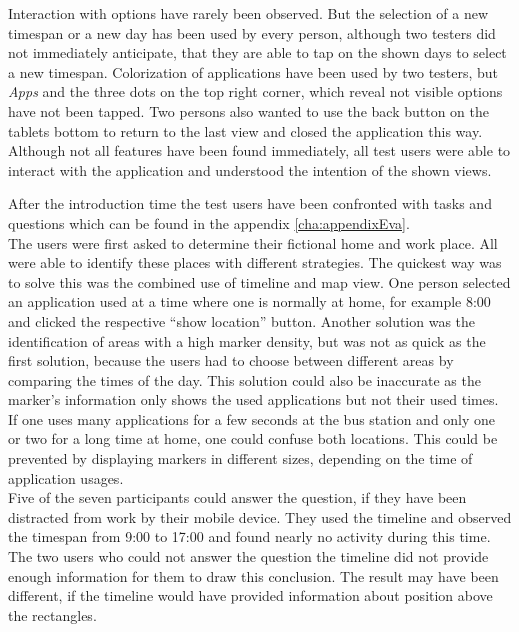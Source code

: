 Interaction  with options have rarely been observed. But the selection of a new timespan or a new day has been used by every person, although two testers did not immediately anticipate, that they are able to tap on the shown days to select a new timespan. Colorization of applications have been used by two testers, but \emph{Apps} and the three dots on the top right corner, which reveal not visible options have not been tapped. Two persons also wanted to use the back button on the tablets bottom to return to the last view and closed the application this way.\\
Although not all features have been found immediately, all test users were able to interact with the application and understood the intention of the shown views.

After the introduction time the test users have been confronted with tasks and questions which can be found in the appendix \ref{cha:appendixEva}.\\
The  users were first asked to determine their fictional home and work place. All were able to identify these places with different strategies. The quickest way was to solve this was the combined use of timeline and map view. One person selected an application used at a time where one is normally at home, for example 8:00 and clicked the respective ``show location'' button. Another solution was the identification of areas with a high marker density, but was not as quick as the first solution, because the users had to choose between different areas by comparing the times of the day. This solution could also be inaccurate as the marker's information only shows the used applications but not their used times. If one uses many applications for a few seconds at the bus station and only one or two for a long time at home, one could confuse both locations. This could be prevented by displaying markers in different sizes, depending on the time of application usages.\\
Five  of the seven participants could answer the question, if they have been distracted from work by their mobile device. They used the timeline and observed the timespan from 9:00 to 17:00 and found nearly no activity during this time. The two users who could not answer the question the timeline did not provide enough information for them to draw this conclusion. The result may have been different, if the timeline would have provided information about position above the rectangles.\\
